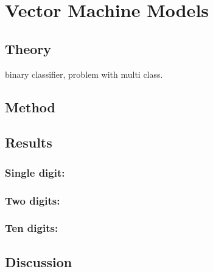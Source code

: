 \chapter{Vector Machine Models}
\section{Theory}
binary classifier, problem with multi class. 
\section{Method}

\section{Results}

\subsection{Single digit:}

\subsection{Two digits:}

\subsection{Ten digits:}

\section{Discussion}